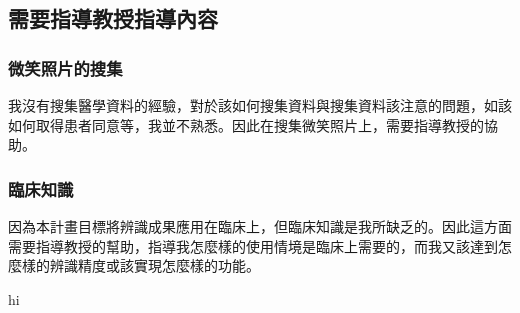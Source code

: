 \subsection{需要指導教授指導內容}

\subsubsection{微笑照片的搜集}
我沒有搜集醫學資料的經驗，對於該如何搜集資料與搜集資料該注意的問題，如該如何取得患者同意等，我並不熟悉。因此在搜集微笑照片上，需要指導教授的協助。
\subsubsection{臨床知識}
因為本計畫目標將辨識成果應用在臨床上，但臨床知識是我所缺乏的。因此這方面需要指導教授的幫助，指導我怎麼樣的使用情境是臨床上需要的，而我又該達到怎麼樣的辨識精度或該實現怎麼樣的功能。

hi

 

